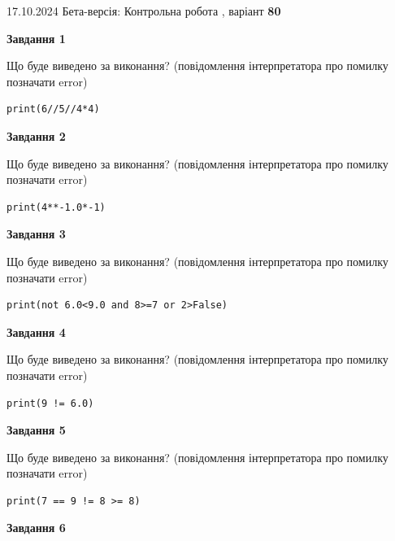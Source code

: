 \documentclass[12pt, ukrainian]{article}
\begin{document}
{\Large{17.10.2024 Бета-версія: Контрольна робота , варіант  \No \textbf { 80 }\par}}
{
\begin {large}
{\begin {center}\textbf{Завдання 1}\end {center}}

Що буде виведено за виконання? (повідомлення інтерпретатора про помилку позначати error)\par
\begin{verbatim}
print(6//5//4*4)
\end{verbatim}

{\begin {center}\textbf{Завдання 2}\end {center}}

Що буде виведено за виконання? (повідомлення інтерпретатора про помилку позначати error)\par
\begin{verbatim}
print(4**-1.0*-1)
\end{verbatim}

{\begin {center}\textbf{Завдання 3}\end {center}}

Що буде виведено за виконання? (повідомлення інтерпретатора про помилку позначати error)\par
\begin{verbatim}
print(not 6.0<9.0 and 8>=7 or 2>False)
\end{verbatim}

{\begin {center}\textbf{Завдання 4}\end {center}}

Що буде виведено за виконання? (повідомлення інтерпретатора про помилку позначати error)\par
\begin{verbatim}
print(9 != 6.0)
\end{verbatim}

{\begin {center}\textbf{Завдання 5}\end {center}}

Що буде виведено за виконання? (повідомлення інтерпретатора про помилку позначати error)\par
\begin{verbatim}
print(7 == 9 != 8 >= 8)
\end{verbatim}

{\begin {center}\textbf{Завдання 6}\end {center}}


\end{large}}
\end{document}
